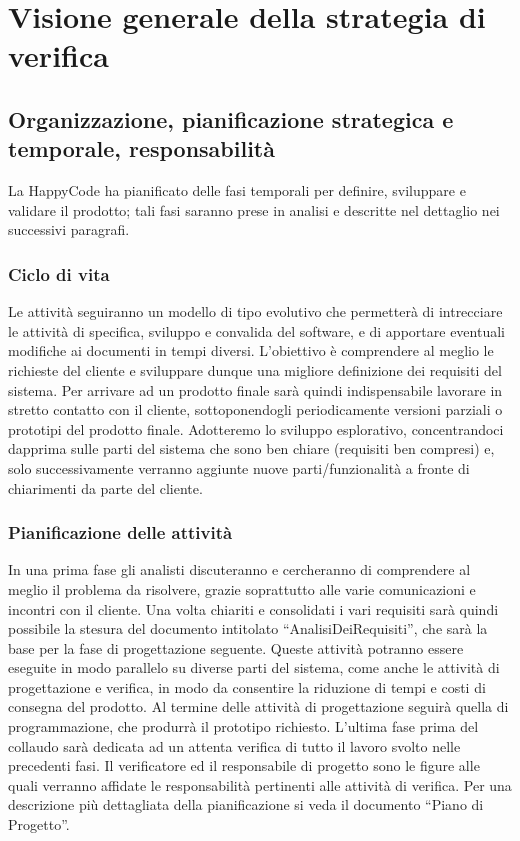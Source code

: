 \chapter[Strategia di verifica]{Visione generale della strategia di verifica}
\section[Organizzazione, pianificazione, responsabilit\`a]{Organizzazione, pianificazione strategica e temporale, responsabilit\`a}
La HappyCode ha  pianificato delle fasi temporali per definire, sviluppare e validare il prodotto; tali fasi saranno prese in analisi e descritte nel dettaglio nei successivi paragrafi.

\subsection{Ciclo di vita}
Le attivit\`a seguiranno un modello di tipo evolutivo che permetter\`a di intrecciare le attivit\`a di specifica, sviluppo e convalida del software, e di apportare eventuali modifiche ai documenti in tempi diversi. L'obiettivo \`e comprendere al meglio le richieste del cliente e sviluppare dunque una migliore definizione dei requisiti del sistema. Per arrivare ad un prodotto finale sar\`a quindi indispensabile lavorare in stretto contatto con il cliente, sottoponendogli periodicamente versioni parziali o prototipi del prodotto finale. Adotteremo lo sviluppo esplorativo, concentrandoci dapprima sulle parti del sistema che sono ben chiare (requisiti ben compresi) e, solo successivamente verranno aggiunte nuove parti/funzionalit\`a a fronte di chiarimenti da parte del cliente. 
\subsection{Pianificazione delle attivit\`a}
In una prima fase gli analisti discuteranno e cercheranno di comprendere al meglio il problema da risolvere, grazie soprattutto alle varie comunicazioni e incontri con il cliente. Una volta chiariti e consolidati i vari requisiti sar\`a quindi possibile la stesura del documento intitolato ``AnalisiDeiRequisiti'', che sar\`a la base per la fase di progettazione seguente. Queste attivit\`a potranno essere eseguite in modo parallelo su diverse parti del sistema, come anche le attivit\`a di progettazione e verifica, in modo da consentire la riduzione di tempi e costi di consegna del prodotto. Al termine delle attivit\`a di progettazione seguir\`a quella di programmazione, che produrr\`a il prototipo richiesto. L'ultima fase prima del collaudo sar\`a dedicata ad un attenta verifica di tutto il lavoro svolto nelle precedenti fasi. Il verificatore ed il responsabile di progetto sono le figure alle quali verranno affidate le responsabilit\`a pertinenti alle attivit\`a di verifica. Per una descrizione pi\`u dettagliata della pianificazione si veda il documento ``Piano di Progetto''.

